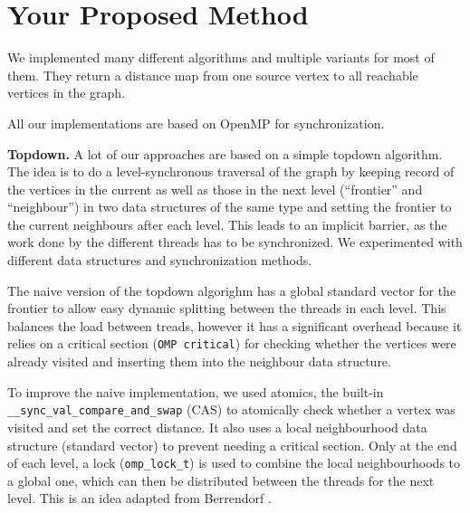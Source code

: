 \documentclass[letterpaper]{article}
\newcommand{\mypar}[1]{{\bf #1.}}
\begin{document}
\section{Your Proposed Method}\label{sec:yourmethod}

%
%

We implemented many different algorithms and multiple variants for most of them. They return a distance map from one source vertex to all reachable vertices in the graph.

All our implementations are based on OpenMP for synchronization.


\mypar{Topdown}
A lot of our approaches are based on a simple topdown algorithm. The idea is to do a level-synchronous traversal of the graph by keeping record of the vertices in the current as well as those in the next level (``frontier'' and ``neighbour'') in two data structures of the same type and setting the frontier to the current neighbours after each level. This leads to an implicit barrier, as the work done by the different threads has to be synchronized. We experimented with different data structures and synchronization methods.

The naive version of the topdown algorighm has a global standard vector for the frontier to allow easy dynamic splitting between the threads in each level. This balances the load between treads, however it has a significant overhead because it relies on a critical section (\verb+OMP critical+) for checking whether the vertices were already visited and inserting them into the neighbour data structure.

To improve the naive implementation, we used atomics, the built-in \verb+__sync_val_compare_and_swap+ (CAS) to atomically check whether a vertex was visited and set the correct distance. It also uses a local neighbourhood data structure (standard vector) to prevent needing a critical section. Only at the end of each level, a lock (\verb+omp_lock_t+) is used to combine the local neighbourhoods to a global one, which can then be distributed between the threads for the next level. This is an idea adapted from Berrendorf \cite{Berrendorf:14}.
\end{document}
